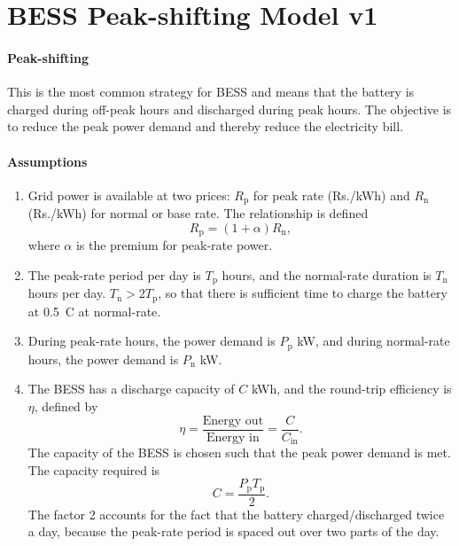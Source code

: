 \section{BESS Peak-shifting Model v1}

\paragraph{Peak-shifting} This is the most common strategy for BESS
and means that the battery is charged during off-peak hours and 
discharged during peak hours. The objective is to reduce the peak
power demand and thereby reduce the electricity bill.

\paragraph{Assumptions}
\begin{enumerate}
    \item Grid power is available at two prices: $R_{\text{p}}$ for peak
    rate (Rs./kWh) and $R_{\text{n}}$ (Rs./kWh) for normal or base rate.
    The relationship is defined
    \begin{equation}
        R_{\text{p}} = (1 + \alpha) R_{\text{n}},
    \end{equation} 
    where $\alpha$ is the premium for peak-rate power.

    \item The peak-rate period per day is $T_{\text{p}}$ hours, and the 
    normal-rate duration is $T_{\text{n}}$ hours per day.
    $T_{\text{n}} > 2 T_{\text{p}} $, so that there is sufficient time 
    to charge the battery at 0.5~C at normal-rate. 

    \item During peak-rate hours, the power demand is $P_{\text{p}}$ kW, 
    and during normal-rate hours, the power demand is $P_{\text{n}}$ kW.

    \item The BESS has a discharge capacity of $C$ kWh, and the round-trip efficiency 
    is $\eta$, defined by
    \begin{equation}
        \eta = \frac{\text{Energy out}}{\text{Energy in}} = \frac{C}{C_{\text{in}}}.
    \end{equation}
    The capacity of the BESS is chosen such that the peak power demand is met. 
    The capacity required is
    \begin{equation}
        \label{eq:cv1}
        C = \frac{P_{\text{p}} T_{\text{p}} }{2}.
    \end{equation}
    The factor 2 accounts for the fact that the battery charged/discharged twice a day,
    because the peak-rate period is spaced out over two parts of the day.


\end{enumerate}


